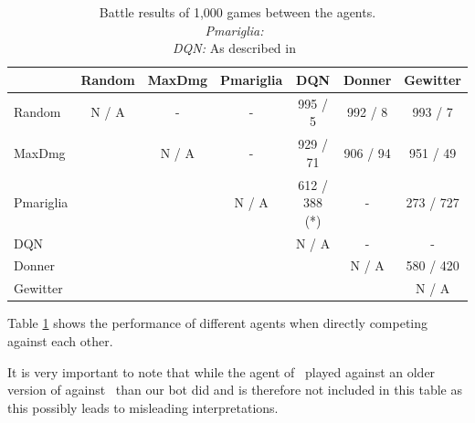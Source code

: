 \begin{table}[h]
  \centering
  \caption{Battle results of 1,000 games between the agents. \\
  \emph{Pmariglia:}~\autocite{Github:pmariglia-showdown} \\
  \emph{DQN:} As described  in~\autocite{Huang_Lee_2019}}
  \begin{tabular}{|l|c|c|c|c|c|c|}
    \hline
     & Random & MaxDmg & Pmariglia & DQN & Donner   & Gewitter  \\
    \hline
    Random                                         & N / A  & -      & -         & 995 / 5   & 992 / 8  & 993 / 7   \\
    \hline
    MaxDmg                                         &        & N / A  & -         & 929 / 71  & 906 / 94 & 951 / 49  \\
    \hline
    Pmariglia                                      &        &        & N / A     & 612 / 388 (*)  & -   & 273 / 727 \\
    \hline
    DQN                                            &        &        &           & N / A     & -        & -         \\
    \hline
    Donner                                         &        &        &           &           & N / A    & 580 / 420 \\
    \hline
    Gewitter                                       &        &        &           &           &          & N / A     \\                            
    \hline
    \end{tabular}
    \label{tab:agent-performance}
  \end{table}
Table \ref{tab:agent-performance} shows the performance of different agents when directly competing against each other.

It is very important to note that while the agent of~\autocite{Huang_Lee_2019} played against an older version of
against~\autocite*{Github:pmariglia-showdown} than our bot did and is therefore not included in this table as 
this possibly leads to misleading interpretations. 


